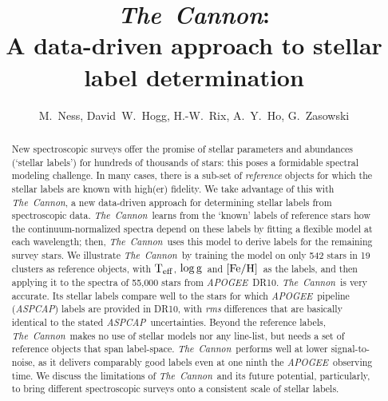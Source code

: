 \documentclass[12pt, preprint]{aastex}
\newcommand{\tc}{\textsl{The~Cannon}}
\newcommand{\apogee}{\textsl{APOGEE}}
\newcommand{\aspcap}{\textsl{ASPCAP}}
\newcommand{\teff}{\mbox{$\rm T_{eff}$}}
\newcommand{\feh}{\mbox{$\rm [Fe/H]$}}
\newcommand{\logg}{\mbox{$\rm \log g$}}
\begin{document}
\title{\tc:\\ A data-driven approach to stellar label determination}
\author{M.~Ness,  
David~W.~Hogg, 
H.-W.~Rix, 
A.~Y.~Ho, 
G.~Zasowski}

\begin{abstract}%
New spectroscopic surveys offer the promise of stellar
parameters and abundances (`stellar labels') for hundreds of thousands
of stars: this poses a formidable spectral modeling challenge. In many cases, there is a sub-set of \emph{reference}
objects for which the stellar labels are known with high(er)
fidelity. We take advantage of this with \tc , a new data-driven
approach for determining stellar labels from spectroscopic data.
\tc\ learns from the `known' labels of reference stars 
how the continuum-normalized spectra depend on these labels
by fitting a flexible model at each wavelength;
then,  \tc\ uses this model to derive labels for the remaining survey stars.
We illustrate \tc\ by training the model 
 on only 542 stars in 19 clusters as reference objects, with \teff, \logg\ and \feh\ as the labels,
and then applying it to the spectra of 55,000 stars from
\apogee\ DR10.
\tc\ is very accurate. Its stellar labels compare well to the
stars for which \apogee\ pipeline (\aspcap) labels are provided in DR10, with 
\textit{rms} differences that are basically identical to the stated \aspcap\ uncertainties.
Beyond the reference labels, \tc\ makes no use of
stellar models nor any line-list, but needs a set of reference objects that span label-space.
\tc\  performs well at lower signal-to-noise, as it delivers comparably 
good labels even at one ninth the \apogee\ observing time.
We discuss the limitations of \tc\ and its future potential, particularly, 
to bring different spectroscopic surveys onto a consistent
scale of stellar labels.
\end{abstract}
\end{document}

